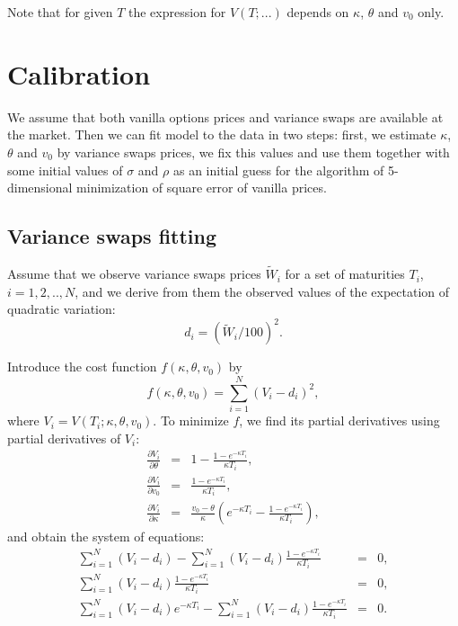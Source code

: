\documentclass[12pt,amsfonts,enumerate,amscd]{amsart}
\numberwithin{table}{section}
\numberwithin{equation}{section}
\begin{document}
Note that for given $T$ the expression for $V(T;...)$ depends on $\kappa$, $\theta$ and $v_0$ only.

 \section{Calibration}

We assume that both vanilla options prices and variance swaps are available at the market.
Then we can fit model to the data in two steps: first, we estimate $\kappa$, $\theta$ and $v_0$ by variance swaps prices, we fix this values and use them together with some initial values of $\sigma$ and $\rho$ as an initial guess for the algorithm of 5-dimensional minimization of square error of vanilla prices.

\subsection{Variance swaps fitting}

Assume that we observe variance swaps prices $\tilde{W}_i$ for a set of maturities $T_i$, $i=1, 2, .., N$, and we derive from them the observed values of the expectation of quadratic variation:
\[
d_i = \left( \tilde{W}_i/100\right)^2. 
\]
 
Introduce the cost function $f(\kappa, \theta, v_0)$ by
\[
f(\kappa, \theta, v_0)=\sum_{i=1}^N \left( V_i - d_i\right)^2, 
\]
where $V_i = V(T_i; \kappa, \theta, v_0)$.
 To minimize $f$, we find its partial derivatives using partial derivatives of $V_i$:
\begin{eqnarray*}%
\frac{\partial V_i}{\partial \theta} &=& 1 - \frac{1-e^{-\kappa T_i}}{\kappa T_i},\\
\frac{\partial V_i}{\partial v_0} &=& \frac{1-e^{-\kappa T_i}}{\kappa T_i}, \\
\frac{\partial V_i}{\partial \kappa} &=& \frac{v_0-\theta}{\kappa}\left( e^{-\kappa T_i} - \frac{1-e^{-\kappa T_i}}{\kappa T_i}\right), 
\end{eqnarray*}
 and obtain the system of equations:
\begin{eqnarray*}%
\sum_{i=1}^N \left( V_i - d_i\right) - \sum_{i=1}^N \left( V_i - d_i\right)\frac{1-e^{-\kappa T_i}}{\kappa T_i} &=&0, \\
\sum_{i=1}^N \left( V_i - d_i \right) \frac{1-e^{-\kappa T_i}}{\kappa T_i}&=&0, \\
\sum_{i=1}^N \left( V_i - d_i \right)e^{-\kappa T_i} -  \sum_{i=1}^N \left( V_i - d_i \right)\frac{1-e^{-\kappa T_i}}{\kappa T_i} &=&0.
\end{eqnarray*}
\end{document}
